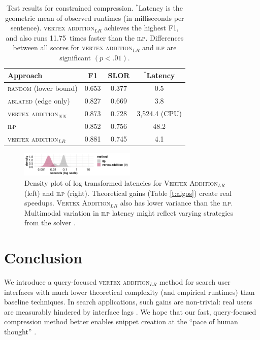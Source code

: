 \documentclass[11pt,a4paper]{article}
\newcommand{\exact}[0]{11.75~}
\begin{document}
{\begin{table}[]
\begin{tabular}{lccc}
\centering
Approach & F1 & SLOR & $^{*}$Latency \\ \hline
\textsc{random} {\small (lower bound) }&{\small 0.653}&{\small 0.377}& {\small 0.5} \\
\textsc{ablated} {\small (edge only) }&{\small 0.827}&{\small 0.669}&{\small 3.8}\\
\textsc{vertex addition}$_{NN}$& {\small 0.873}& {\small 0.728}& {\small 3,524.4} {\tiny  (CPU)} \\ \midrule 
\textsc{ilp}&{\small 0.852}& {\small 0.756}&{\small 48.2}\\
\textsc{vertex addition}$_{LR}$ & \small 0.881 & {\small 0.745}& \small 4.1 \\
\end{tabular}
\caption{Test results for constrained compression. $^*$Latency is the geometric mean of observed runtimes (in milliseconds per sentence). \textsc{vertex addition}$_{LR}$ achieves the highest F1, and also runs \exact times faster than the \textsc{ilp}. Differences between all scores for \textsc{vertex addition}$_{LR}$ and \textsc{ilp} are significant {\tiny $(p < .01)$}.}
\label{t:results}
\end{table}

\begin{figure}[htb!]
\centering
\includegraphics[width=5.5cm]{times.pdf}
\caption{Density plot of log transformed latencies for \textsc{Vertex Addition}$_{LR}$ (left) and \textsc{ilp} (right). Theoretical gains (Table \ref{t:algos}) create real speedups. \textsc{Vertex Addition}$_{LR}$ also has lower variance than the \textsc{ilp}. Multimodal variation in \textsc{ilp} latency might reflect varying strategies from the  solver \cite{gurobi}.}
\label{t:times}
\end{figure}

\section{Conclusion}

We introduce a query-focused \textsc{vertex addition}$_{LR}$ method for search user interfaces with much lower theoretical complexity (and empirical runtimes) than baseline techniques. In search applications, such gains are non-trivial: real users are measurably hindered by interface lags \cite{Nielsen,Liu2014TheEO}. We hope that our fast, query-focused compression method better enables snippet creation at the ``pace of human thought'' \cite{heerschei}.


}
\end{document}
